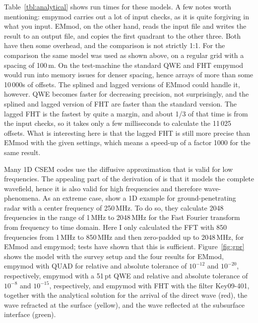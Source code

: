 \documentclass[manuscript,revised]{geophysics}
\begin{document}
Table~\ref{tbl:analytical} shows run times for these models. A few notes worth
mentioning: empymod carries out a lot of input checks, as it is quite forgiving
in what you input. EMmod, on the other hand, reads the input file and writes
the result to an output file, and copies the first quadrant to the other three.
Both have then some overhead, and the comparison is not strictly 1:1. For the
comparison the same model was used as shown above, on a regular grid with a
spacing of 100\,m. On the test-machine the standard QWE and FHT empymod would
run into memory issues for denser spacing, hence arrays of more than some
10\,000s of offsets. The splined and lagged versions of EMmod could handle it,
however.
%
%
QWE becomes faster for decreasing precision, not surprisingly, and the splined
and lagged version of FHT are faster than the standard version. The lagged FHT
is the fastest by quite a margin, and about 1/3 of that time is from the input
checks, so it takes only a few milliseconds to calculate the 11\,025 offsets.
What is interesting here is that the lagged FHT is still more precise than
EMmod with the given settings, which means a speed-up of a factor 1000 for the
same result.

Many 1D CSEM codes use the diffusive approximation that is valid for low
frequencies. The appealing part of the derivation of \cite{GEO.15.Hunziker} is
that it models the complete wavefield, hence it is also valid for high
frequencies and therefore wave-phenomena. As an extreme case,
\cite{GEO.15.Hunziker} show a 1D example for ground-penetrating radar with a
center frequency of 250\,MHz. To do so, they calculate 2048 frequencies in the
range of 1\,MHz to 2048\,MHz for the Fast Fourier transform from frequency to
time domain. Here I only calculated the FFT with 850 frequencies from 1\,MHz to
850\,MHz and then zero-padded up to 2048\,MHz, for EMmod and empymod; tests
have shown that this is sufficient. Figure~\ref{fig:gpr} shows the model with
the survey setup and the four results for EMmod, empymod with QUAD for relative
and absolute tolerance of $10^{-12}$ and $10^{-20}$, respectively, empymod with
a 51\,pt QWE and relative and absolute tolerance of $10^{-8}$ and $10^{-15}$,
respectively, and empymod with FHT with the filter Key09-401, together with the
analytical solution for the arrival of the direct wave (red), the wave
refracted at the surface (yellow), and the wave reflected at the subsurface
interface (green).
\end{document}
